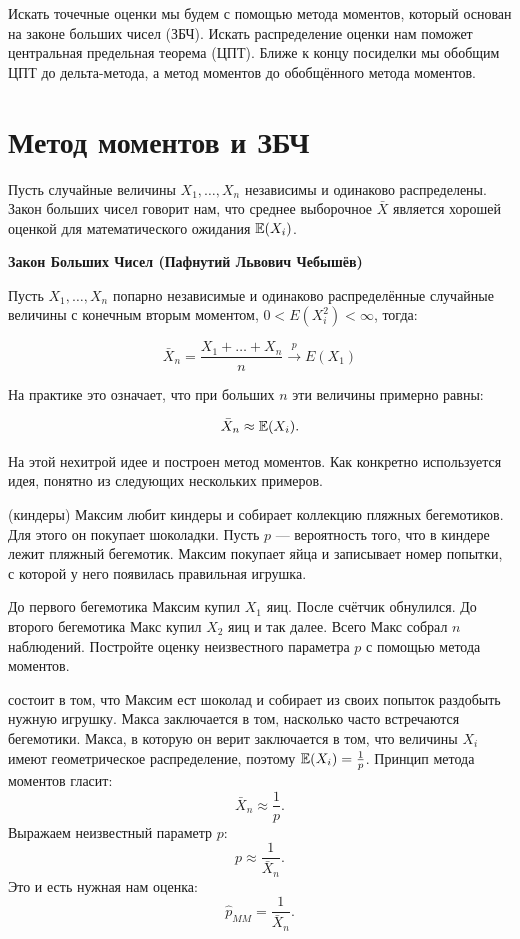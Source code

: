 \documentclass[12pt, a4paper, oneside]{article}
\begin{document}
Искать точечные оценки мы будем с помощью метода моментов, который основан на законе больших чисел (ЗБЧ). Искать распределение оценки нам поможет центральная предельная теорема (ЦПТ). Ближе к концу посиделки мы обобщим ЦПТ до дельта-метода, а метод моментов до обобщённого метода моментов. 

\section{Метод моментов и ЗБЧ}

Пусть случайные величины $X_{1}, \ldots, X_{n}$ независимы и одинаково распределены. Закон больших чисел говорит нам, что среднее выборочное $\bar{X}$ является хорошей оценкой для математического ожидания $ \mathbb{E}(X_{i}) $.

\begin{theorem}{\textbf{Закон Больших Чисел (Пафнутий Львович Чебышёв)}}

Пусть $X_1, \ldots, X_n$ попарно независимые и одинаково распределённые случайные величины с конечным вторым моментом, $0 < E(X_i^2) < \infty$, тогда:

$$
\bar{X}_{n} = \frac{X_1 + \ldots + X_n}{n} \stackrel{p}{\longrightarrow} E(X_1)
$$
\end{theorem}

На практике это означает, что при больших $n$ эти величины примерно равны:

\[
\bar{X}_{n} \approx \mathbb{E}(X_{i}).
\]

На этой нехитрой идее и построен метод моментов. Как конкретно используется идея, понятно из следующих нескольких примеров.

\begin{problem}{(киндеры)}
    Максим любит киндеры и собирает коллекцию пляжных бегемотиков. Для этого он покупает шоколадки. Пусть $p$ --- вероятность того, что в киндере лежит пляжный бегемотик. Максим покупает яйца и записывает номер попытки, с которой у него появилась правильная игрушка.
    
    До первого бегемотика Максим купил $X_1$ яиц. После счётчик обнулился. До второго бегемотика Макс купил $X_2$ яиц и так далее. Всего Макс собрал $n$ наблюдений. Постройте оценку неизвестного параметра $p$ с помощью метода моментов.
\end{problem}

\begin{sol}
 состоит в том, что Максим ест шоколад и собирает  из своих попыток раздобыть нужную игрушку.  Макса заключается в том, насколько часто встречаются бегемотики.  Макса, в которую он верит заключается в том, что величины $X_{i}$ имеют геометрическое распределение, поэтому $\mathbb{E}(X_{i})=\frac{1}{p}$. Принцип метода моментов гласит:
	\[ \bar{X}_{n}\approx \frac{1}{p}.\]
	Выражаем неизвестный параметр $ p $:
	\[ p\approx \frac{1}{\bar{X}_{n}}. \]
	Это и есть нужная нам оценка:
	\[ \hat{p}_{MM} = \frac{1}{\bar{X}_{n}}. \]
\end{sol}
\end{document}
